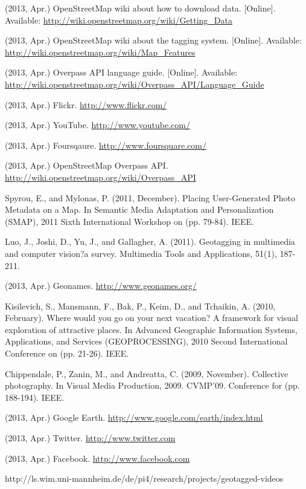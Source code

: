\documentclass[journal]{IEEEtran}
\begin{document}
\begin{thebibliography}{1}

(2013, Apr.) OpenStreetMap wiki about how to download data. [Online]. Available: \url{http://wiki.openstreetmap.org/wiki/Getting_Data}

(2013, Apr.) OpenStreetMap wiki about the tagging system. [Online]. Available: \url{http://wiki.openstreetmap.org/wiki/Map_Features}

(2013, Apr.) Overpass API language guide. [Online]. Available: \url{http://wiki.openstreetmap.org/wiki/Overpass_API/Language_Guide}

(2013, Apr.) Flickr. \url{http://www.flickr.com/}

(2013, Apr.) YouTube. \url{http://www.youtube.com/}

(2013, Apr.) Foursqaure. \url{http://www.foursquare.com/}

(2013, Apr.) OpenStreetMap Overpass API. \url{http://wiki.openstreetmap.org/wiki/Overpass_API}

Spyrou, E., and Mylonas, P. (2011, December). Placing User-Generated Photo Metadata on a Map. In Semantic Media Adaptation and Personalization (SMAP), 2011 Sixth International Workshop on (pp. 79-84). IEEE.

Luo, J., Joshi, D., Yu, J., and Gallagher, A. (2011). Geotagging in multimedia and computer vision?a survey. Multimedia Tools and Applications, 51(1), 187-211.

(2013, Apr.) Geonames. \url{http://www.geonames.org/}

Kisilevich, S., Mansmann, F., Bak, P., Keim, D., and Tchaikin, A. (2010, February). Where would you go on your next vacation? A framework for visual exploration of attractive places. In Advanced Geographic Information Systems, Applications, and Services (GEOPROCESSING), 2010 Second International Conference on (pp. 21-26). IEEE.

Chippendale, P., Zanin, M., and Andreatta, C. (2009, November). Collective photography. In Visual Media Production, 2009. CVMP'09. Conference for (pp. 188-194). IEEE.

(2013, Apr.) Google Earth. \url{http://www.google.com/earth/index.html}

(2013, Apr.) Twitter. \url{http://www.twitter.com}

(2013, Apr.) Facebook. \url{http://www.facebook.com}

http://ls.wim.uni-mannheim.de/de/pi4/research/projects/geotagged-videos




\end{thebibliography}
\end{document}
